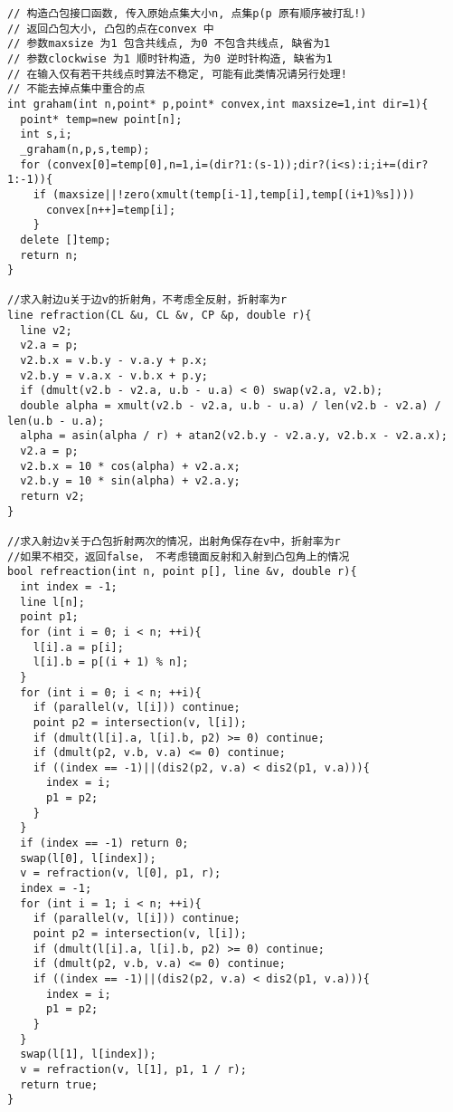\begin{lstlisting}[language={}]
// 构造凸包接口函数, 传入原始点集大小n, 点集p(p 原有顺序被打乱!)
// 返回凸包大小, 凸包的点在convex 中
// 参数maxsize 为1 包含共线点, 为0 不包含共线点, 缺省为1
// 参数clockwise 为1 顺时针构造, 为0 逆时针构造, 缺省为1
// 在输入仅有若干共线点时算法不稳定, 可能有此类情况请另行处理!
// 不能去掉点集中重合的点
int graham(int n,point* p,point* convex,int maxsize=1,int dir=1){
  point* temp=new point[n];
  int s,i;
  _graham(n,p,s,temp);
  for (convex[0]=temp[0],n=1,i=(dir?1:(s-1));dir?(i<s):i;i+=(dir?1:-1)){
    if (maxsize||!zero(xmult(temp[i-1],temp[i],temp[(i+1)%s])))
      convex[n++]=temp[i];
    }
  delete []temp;
  return n;
}

//求入射边u关于边v的折射角，不考虑全反射，折射率为r
line refraction(CL &u, CL &v, CP &p, double r){
  line v2;
  v2.a = p;
  v2.b.x = v.b.y - v.a.y + p.x;
  v2.b.y = v.a.x - v.b.x + p.y;
  if (dmult(v2.b - v2.a, u.b - u.a) < 0) swap(v2.a, v2.b);
  double alpha = xmult(v2.b - v2.a, u.b - u.a) / len(v2.b - v2.a) / len(u.b - u.a);
  alpha = asin(alpha / r) + atan2(v2.b.y - v2.a.y, v2.b.x - v2.a.x);
  v2.a = p;
  v2.b.x = 10 * cos(alpha) + v2.a.x;
  v2.b.y = 10 * sin(alpha) + v2.a.y;
  return v2;
}

//求入射边v关于凸包折射两次的情况，出射角保存在v中，折射率为r
//如果不相交，返回false， 不考虑镜面反射和入射到凸包角上的情况
bool refreaction(int n, point p[], line &v, double r){
  int index = -1;
  line l[n];
  point p1;
  for (int i = 0; i < n; ++i){
    l[i].a = p[i];
    l[i].b = p[(i + 1) % n];
  }
  for (int i = 0; i < n; ++i){
    if (parallel(v, l[i])) continue;
    point p2 = intersection(v, l[i]);
    if (dmult(l[i].a, l[i].b, p2) >= 0) continue;
    if (dmult(p2, v.b, v.a) <= 0) continue;
    if ((index == -1)||(dis2(p2, v.a) < dis2(p1, v.a))){
      index = i;
      p1 = p2;
    }
  }
  if (index == -1) return 0;
  swap(l[0], l[index]);
  v = refraction(v, l[0], p1, r);
  index = -1;
  for (int i = 1; i < n; ++i){
    if (parallel(v, l[i])) continue;
    point p2 = intersection(v, l[i]);
    if (dmult(l[i].a, l[i].b, p2) >= 0) continue;
    if (dmult(p2, v.b, v.a) <= 0) continue;
    if ((index == -1)||(dis2(p2, v.a) < dis2(p1, v.a))){
      index = i;
      p1 = p2;
    }
  }
  swap(l[1], l[index]);
  v = refraction(v, l[1], p1, 1 / r);
  return true;
}
\end{lstlisting}

